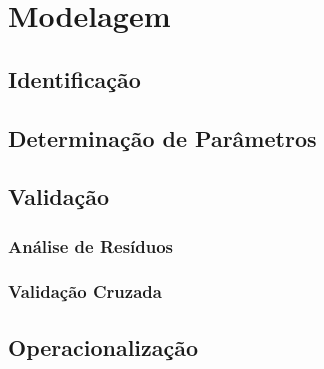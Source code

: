 \chapter{Modelagem}

\section{Identificação}

\section{Determinação de Parâmetros}

\section{Validação}

\subsection{Análise de Resíduos}
\label{sec:residual_analysis}

\subsection{Validação Cruzada}

\section{Operacionalização}
